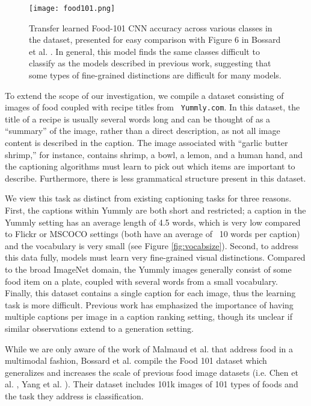 \documentclass[11pt]{article}
\begin{document}
\begin{figure*}[t]
\centering
\texttt{[image: food101.png]}
\caption{Transfer learned Food-101 CNN accuracy across various classes
  in the dataset, presented for easy comparison with Figure 6 in
  Bossard et al. . In general, this model finds
  the same classes difficult to classify as the models described in
  previous work, suggesting that some types of fine-grained
  distinctions are difficult for many models.}
\label{fig:food101}
\end{figure*}

To extend the scope of our investigation, we compile a dataset
consisting of images of food coupled with recipe titles from {\tt
  Yummly.com}. In this dataset, the title of a recipe is usually
several words long and can be thought of as a ``summary'' of the
image, rather than a direct description, as not all image content is
described in the caption. The image associated with ``garlic butter
shrimp,'' for instance, contains shrimp, a bowl, a lemon, and a human
hand, and the captioning algorithms must learn to pick out which items
are important to describe. Furthermore, there is less grammatical
structure present in this dataset.

We view this task as distinct from existing captioning tasks for three
reasons. First, the captions within Yummly are both short and
restricted; a caption in the Yummly setting has an average length of
4.5 words, which is very low compared to Flickr or MSCOCO settings
(both have an average of ~10 words per caption) and the vocabulary is
very small (see Figure \ref{fig:vocabsize}). Second, to address this
data fully, models must learn very fine-grained visual
distinctions. Compared to the broad ImageNet domain, the Yummly images
generally consist of some food item on a plate, coupled with several
words from a small vocabulary. Finally, this dataset contains a single
caption for each image, thus the learning task is more
difficult. Previous work \cite{hodosh2013framing} has emphasized the
importance of having multiple captions per image in a caption ranking
setting, though its unclear if similar observations extend to a
generation setting.

While we are only aware of the work of Malmaud et
al.  that address food in a multimodal
fashion, Bossard et al.  compile the Food 101
dataset which generalizes and increases the scale of previous food
image datasets (i.e. Chen et al. , Yang et
al. ). Their dataset includes 101k images of
101 types of foods and the task they address is classification.
\end{document}
